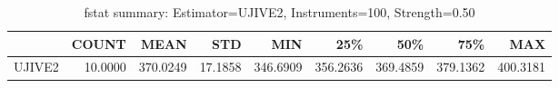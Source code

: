 \begin{table}[ht]
\centering
\caption{fstat summary: Estimator=UJIVE2, Instruments=100, Strength=0.50}
\begin{tabular}{lrrrrrrrr}
\toprule
 & COUNT & MEAN & STD & MIN & 25\% & 50\% & 75\% & MAX \\
\midrule
UJIVE2 & 10.0000 & 370.0249 & 17.1858 & 346.6909 & 356.2636 & 369.4859 & 379.1362 & 400.3181 \\
\bottomrule
\end{tabular}
\end{table}
